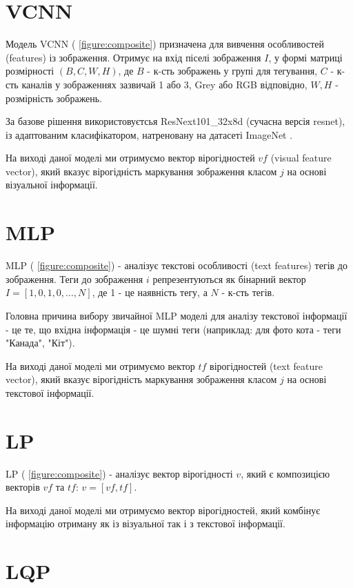 \documentclass{udstu}
\begin{document}
\section{VCNN}

Модель VCNN (\figurename{ \ref{figure:composite}}) призначена для вивчення особливостей (features) із зображення.
Отримує на вхід піселі зображення $I$, у формі матриці розмірності $(B,C,W,H)$, де
$B$ - к-сть зображень у групі для тегування,
$C$ - к-сть каналів у зображеннях зазвичай 1 або 3, Grey або RGB відповідно,
$W,H$ - розмірність зображень.

За базове рішення використовуєтсья ResNext101\_32x8d \cite{resnext} (сучасна версія resnet),
із адаптованим класифікатором, натреновану на датасеті ImageNet \cite{deng2009imagenet}.

На виході даної моделі ми отримуємо вектор вірогідностей $vf$ (visual feature vector),
який вказує вірогідність маркування зображення класом $j$ на основі візуальної інформації.


\section{MLP}

MLP (\figurename{ \ref{figure:composite}}) - аналізує текстові особливості (text features) тегів до зображення.
Теги до зображення $i$ репрезентуються як бінарний вектор $I = [1,0,1,0, ..., N]$,
де 1 - це наявність тегу, а $N$ - к-сть тегів.

Головна причина вибору звичайної MLP моделі для аналізу текстової інформації - це
те, що вхідна інформація - це шумні теги (наприклад: для фото кота - теги "Канада", "Кіт").

На виході даної моделі ми отримуємо вектор $tf$ вірогідностей (text feature vector),
який вказує вірогідність маркування зображення класом $j$ на основі текстової інформації.


\section{LP}

LP (\figurename{ \ref{figure:composite}}) - аналізує вектор вірогідності $v$,
який є композицією векторів $vf$ та $tf$: $v = [vf, tf]$.

На виході даної моделі ми отримуємо вектор вірогідностей, який комбінує інформацію отриману як із візуальної так і з
текстової інформації.


\section{LQP}
\end{document}
